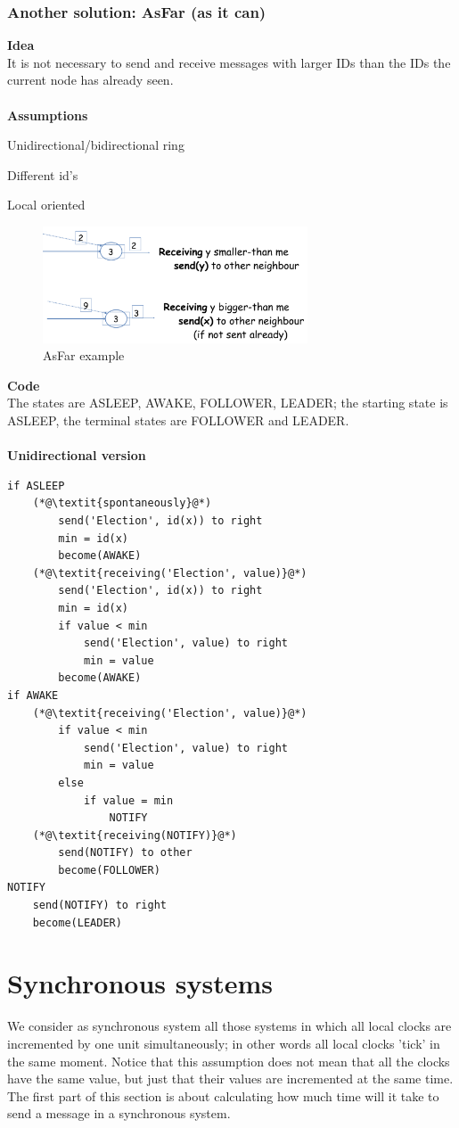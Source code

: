 \documentclass[paper=a4, fontsize=11pt]{scrartcl} %
\numberwithin{equation}{section} %
\numberwithin{figure}{section} %
\numberwithin{table}{section} %
\begin{document}
\subsubsection*{Another solution: AsFar (as it can)}
\textbf{Idea} \\ It is not necessary to send and receive messages with larger IDs than the IDs the current node has already seen.\\
~ \\ \textbf{Assumptions}
\begin{compactitem}
\item Unidirectional/bidirectional ring
\item Different id's
\item Local oriented
\end{compactitem}
\begin{figure}[H]
  \centering
  \includegraphics[width=0.7\textwidth]{img/asfar.png}
  \caption{AsFar example}
  
\end{figure}
\textbf{Code} \\The states are ASLEEP, AWAKE, FOLLOWER, LEADER; the starting state is ASLEEP, the terminal states are FOLLOWER and LEADER.\\ \\
\textbf{Unidirectional version}
\begin{lstlisting}
if ASLEEP
	(*@\textit{spontaneously}@*)
		send('Election', id(x)) to right
		min = id(x)
		become(AWAKE)
	(*@\textit{receiving('Election', value)}@*)
		send('Election', id(x)) to right
		min = id(x)
		if value < min
			send('Election', value) to right
			min = value
		become(AWAKE)		
if AWAKE
	(*@\textit{receiving('Election', value)}@*)
		if value < min
			send('Election', value) to right
			min = value
		else
			if value = min
				NOTIFY
	(*@\textit{receiving(NOTIFY)}@*)
		send(NOTIFY) to other
		become(FOLLOWER)
NOTIFY
	send(NOTIFY) to right
	become(LEADER)						
\end{lstlisting}


\section*{Synchronous systems}
We consider as synchronous system all those systems in which all local clocks are incremented by one unit simultaneously; in other words all local clocks 'tick' in the same moment. Notice that this assumption does not mean that all the clocks have the same value, but just that their values are incremented at the same time.\\ 
The first part of this section is about calculating how much time will it take to send a message in a synchronous system.
\end{document}
